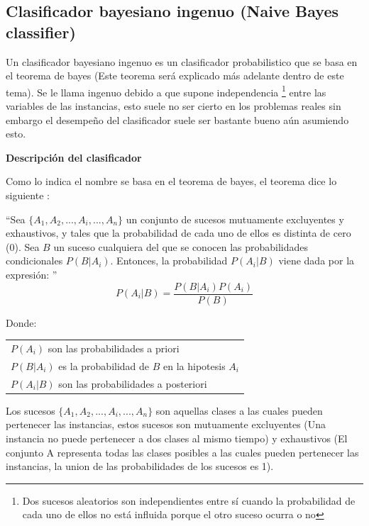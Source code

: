 \documentclass[11pt,fleqn]{book} %
\begin{document}
\subsection{Clasificador bayesiano ingenuo (Naive Bayes classifier)} 

Un clasificador bayesiano ingenuo es un clasificador probabilistico que se basa en el teorema de bayes (Este teorema será explicado más adelante dentro de este tema). Se le llama ingenuo debido a que supone independencia \footnote{Dos sucesos aleatorios son independientes entre sí cuando la probabilidad de cada uno de ellos no está influida porque el otro suceso ocurra o no} entre las variables de las instancias, esto suele no ser cierto en los problemas reales sin embargo el desempeño del clasificador suele ser bastante bueno aún asumiendo esto.

\textbf{Descripción del clasificador}

Como lo indica el nombre se basa en el teorema de bayes, el teorema dice lo siguiente \cite{bayes1958essay}:

 ``Sea $\{A_{1},A_{2},...,A_{i},...,A_{n}\}$ un conjunto de sucesos mutuamente excluyentes y exhaustivos, y tales que la probabilidad de cada uno de ellos es distinta de cero (0). Sea $B$ un suceso cualquiera del que se conocen las probabilidades condicionales $P(B|A_{i})$. Entonces, la probabilidad $P(A_{i}|B)$ viene dada por la expresión: ''
\begin{equation}
P(A_{i}|B) = \frac{P(B|A_{i}) P(A_{i})}{P(B)}
\label{eqn:bayes_theorem} 
\end{equation}

Donde:

\begin{tabular}{l}
	$P(A_{i})$ son las probabilidades a priori\\
	$P(B|A_{i})$ es la probabilidad de $B$ en la hipotesis $A_{i}$\\
	$P(A_{i}|B)$ son las probabilidades a posteriori\\
\end{tabular}

Los sucesos $\{A_{1},A_{2},...,A_{i},...,A_{n}\}$ son aquellas clases a las cuales pueden pertenecer las instancias, estos sucesos son mutuamente excluyentes (Una instancia no puede pertenecer a dos clases al mismo tiempo) y exhaustivos (El conjunto A representa todas las clases posibles a las cuales pueden pertenecer las instancias, la union de las probabilidades de los sucesos es 1).
\end{document}
